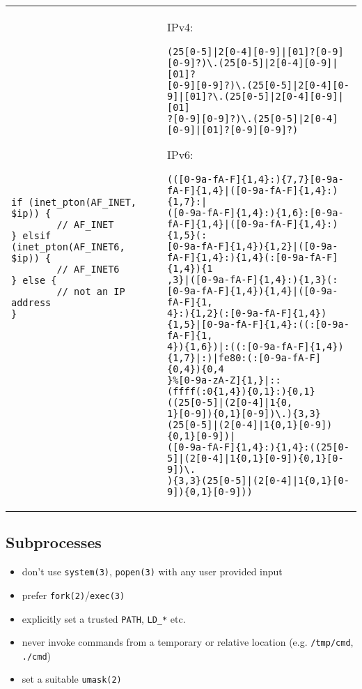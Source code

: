 \documentclass[xga]{xdvislides}
\begin{document}
\begin{tabular}{l l}
\begin{minipage}{4in}
\small
\begin{verbatim}
if (inet_pton(AF_INET, $ip)) {
        // AF_INET
} elsif (inet_pton(AF_INET6, $ip)) {
        // AF_INET6
} else {
        // not an IP address
}
\end{verbatim}
\Normalsize
\end{minipage} & \begin{minipage}{3in}
\small
IPv4:
\begin{verbatim}
(25[0-5]|2[0-4][0-9]|[01]?[0-9][0-9]?)\.(25[0-5]|2[0-4][0-9]|[01]?
[0-9][0-9]?)\.(25[0-5]|2[0-4][0-9]|[01]?\.(25[0-5]|2[0-4][0-9]|[01]
?[0-9][0-9]?)\.(25[0-5]|2[0-4][0-9]|[01]?[0-9][0-9]?)
\end{verbatim}

IPv6:
\begin{verbatim}
(([0-9a-fA-F]{1,4}:){7,7}[0-9a-fA-F]{1,4}|([0-9a-fA-F]{1,4}:){1,7}:|
([0-9a-fA-F]{1,4}:){1,6}:[0-9a-fA-F]{1,4}|([0-9a-fA-F]{1,4}:){1,5}(:
[0-9a-fA-F]{1,4}){1,2}|([0-9a-fA-F]{1,4}:){1,4}(:[0-9a-fA-F]{1,4}){1
,3}|([0-9a-fA-F]{1,4}:){1,3}(:[0-9a-fA-F]{1,4}){1,4}|([0-9a-fA-F]{1,
4}:){1,2}(:[0-9a-fA-F]{1,4}){1,5}|[0-9a-fA-F]{1,4}:((:[0-9a-fA-F]{1,
4}){1,6})|:((:[0-9a-fA-F]{1,4}){1,7}|:)|fe80:(:[0-9a-fA-F]{0,4}){0,4
}%[0-9a-zA-Z]{1,}|::(ffff(:0{1,4}){0,1}:){0,1}((25[0-5]|(2[0-4]|1{0,
1}[0-9]){0,1}[0-9])\.){3,3}(25[0-5]|(2[0-4]|1{0,1}[0-9]){0,1}[0-9])|
([0-9a-fA-F]{1,4}:){1,4}:((25[0-5]|(2[0-4]|1{0,1}[0-9]){0,1}[0-9])\.
){3,3}(25[0-5]|(2[0-4]|1{0,1}[0-9]){0,1}[0-9]))
\end{verbatim}
\Normalsize
\end{minipage}
\end{tabular}

\subsection{Subprocesses}
\begin{itemize}
	\item don't use \verb+system(3)+, \verb+popen(3)+ with any user provided input
	\item prefer \verb+fork(2)+/\verb+exec(3)+
	\item explicitly set a trusted \verb+PATH+, \verb+LD_*+ etc.
	\item never invoke commands from a temporary or relative location (e.g. \verb+/tmp/cmd+, \verb+./cmd+)
	\item set a suitable \verb+umask(2)+
\end{itemize}
\end{document}
